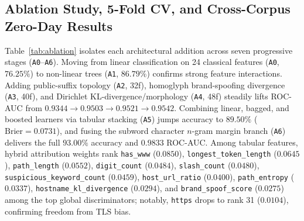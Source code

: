 \documentclass[conference]{IEEEtran}
\begin{document}
\subsection{Ablation Study, 5-Fold CV, and Cross-Corpus Zero-Day Results}
Table~\ref{tab:ablation} isolates each architectural addition across seven progressive stages (\texttt{A0}--\texttt{A6}). Moving from linear classification on 24 classical features (\texttt{A0}, $76.25\%$) to non-linear trees (\texttt{A1}, $86.79\%$) confirms strong feature interactions. Adding public-suffix topology (\texttt{A2}, 32f), homoglyph brand-spoofing divergence (\texttt{A3}, 40f), and Dirichlet KL-divergence/morphology (\texttt{A4}, 48f) steadily lifts ROC-AUC from $0.9344 \to 0.9503 \to 0.9521 \to 0.9542$. Combining linear, bagged, and boosted learners via tabular stacking (\texttt{A5}) jumps accuracy to $89.50\%$ ($\text{Brier}=0.0731$), and fusing the subword character $n$-gram margin branch (\texttt{A6}) delivers the full $93.00\%$ accuracy and $0.9833$ ROC-AUC. Among tabular features, hybrid attribution weights rank \texttt{has\_www} ($0.0850$), \texttt{longest\_token\_length} ($0.0645$), \texttt{path\_length} ($0.0552$), \texttt{digit\_count} ($0.0484$), \texttt{slash\_count} ($0.0480$), \texttt{suspicious\_keyword\_count} ($0.0459$), \texttt{host\_url\_ratio} ($0.0400$), \texttt{path\_entropy} ($0.0337$), \texttt{hostname\_kl\_divergence} ($0.0294$), and \texttt{brand\_spoof\_score} ($0.0275$) among the top global discriminators; notably, \texttt{https} drops to rank 31 ($0.0104$), confirming freedom from TLS bias.

\begin{table}[t]
\caption{Seven-Stage Feature and Ensemble Ablation Study ($N_{\text{test}}=2{,}286$)}
\label{tab:ablation}
\centering
\scriptsize
\renewcommand{\arraystretch}{1.12}
\end{table}
\end{document}
